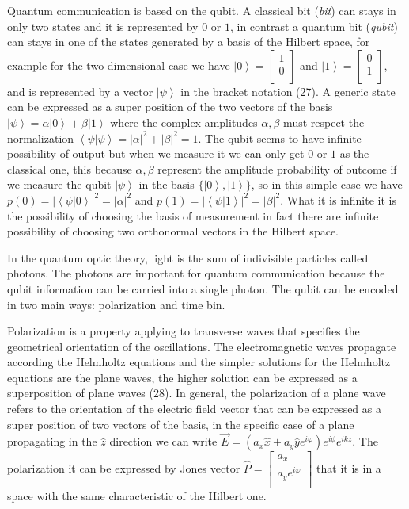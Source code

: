 Quantum communication is based on the qubit. A classical bit (\textit{bit}) can stays in only two states and it is represented by $0$ or $1$, in contrast a quantum bit (\textit{qubit}) can stays in one of the states generated by  a basis of the Hilbert space, for example for the two dimensional case we have $\left|0\right> = \begin{bmatrix} 1 \\ 0 \\ \end{bmatrix}$ and $\left|1\right> = \begin{bmatrix} 0 \\ 1 \\ \end{bmatrix}$, and is represented by a vector $\left|\psi\right>$ in the bracket notation (27). A generic state can be expressed as a super position of the two vectors of the basis $\left|\psi\right> = \alpha\left|0\right> + \beta\left|1\right>$ where the complex amplitudes $\alpha, \beta$ must respect the normalization $\left<\psi|\psi\right> = |\alpha|^2 + |\beta|^2 = 1$. The qubit seems to have infinite possibility of output but when we measure it we can only get $0$ or $1$ as the classical one, this because $\alpha, \beta$ represent the amplitude probability of outcome if we measure the qubit $\left|\psi\right>$ in the basis $\{\left|0\right>, \left|1\right>\}$, so in this simple case we have $p(0) = |\left<\psi|0\right>|^2 = |\alpha|^2$ and $p(1) = |\left<\psi|1\right>|^2 = |\beta|^2$. What it is infinite it is the possibility of choosing the basis of measurement in fact there are infinite possibility of choosing two orthonormal vectors in the Hilbert space.

In the quantum optic theory, light is the sum of indivisible particles called photons. The photons are important for quantum communication because the qubit information can be carried into a single photon. The qubit can be encoded in two main ways: polarization and time bin.

Polarization is a property applying to transverse waves that specifies the geometrical orientation of the oscillations. The electromagnetic waves propagate according the Helmholtz equations and the simpler solutions for the Helmholtz equations are the plane waves, the higher solution can be expressed as a superposition of plane waves (28). In general, the polarization of a plane wave refers to the orientation of the electric field vector that can be expressed as a super position of two vectors of the basis, in the specific case of a plane propagating in the $\hat{z}$ direction we can write $\vec{E} = (a_x \hat{x} + a_y \hat{y} e^{i \varphi}) e^{i \phi} e^{i k z}$. The polarization it can be expressed by Jones vector $\hat{P} = \begin{bmatrix} a_x \\ a_y e^{i\varphi} \\ \end{bmatrix}$ that it is in a space with the same characteristic of the Hilbert one.

